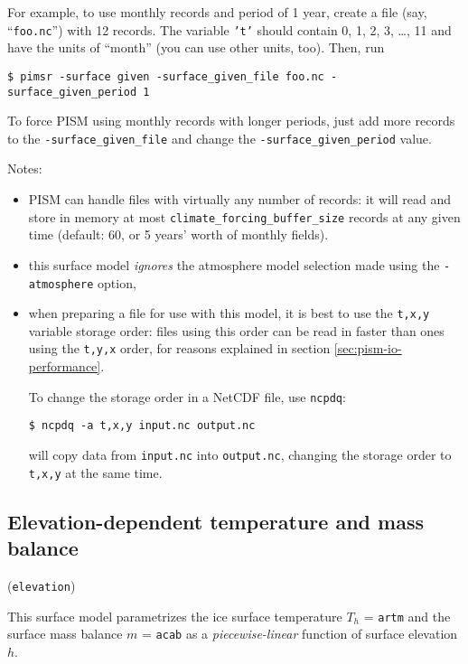 \documentclass[titlepage,letterpaper,final]{scrartcl}
\begin{document}
For example, to use monthly records and period of 1 year, create a file (say, ``\texttt{foo.nc}'') with 12 records. The variable \texttt{'t'} should contain 0, 1, 2, 3, \dots, 11 and have the units of ``month'' (you can use other units, too). Then, run
\begin{verbatim}
$ pimsr -surface given -surface_given_file foo.nc -surface_given_period 1
\end{verbatim}%

To force PISM using monthly records with longer periods, just add more records to the \texttt{-surface_given_file}  and change the \texttt{-surface_given_period} value.

\noindent Notes:
\begin{itemize}
\item PISM can handle files with virtually any number of records: it will
  read and store in memory at most \texttt{climate_forcing_buffer_size} records
  at any given time (default: 60, or 5 years' worth of monthly fields).
\item this surface model \emph{ignores} the atmosphere model selection made
  using the \texttt{-atmosphere} option,
\item when preparing a file for use with this model, it is best to use the \texttt{t,x,y} variable storage order: files using this order can be read in faster than ones using the \texttt{t,y,x} order, for reasons explained in section \ref{sec:pism-io-performance}.

To change the storage order in a NetCDF file, use \texttt{ncpdq}:
\begin{verbatim}
$ ncpdq -a t,x,y input.nc output.nc
\end{verbatim}%
will copy data from \texttt{input.nc} into \texttt{output.nc}, changing the storage order to \texttt{t,x,y} at the same time.
\end{itemize}

\subsection{Elevation-dependent temperature and mass balance}
\label{sec:elev-depend-temp}

(\texttt{elevation})

   This surface model parametrizes the ice surface temperature $T_{h}$ = \texttt{artm} and the surface mass balance $m$ = \texttt{acab} as a \emph{piecewise-linear} function of surface elevation $h$.
\end{document}
